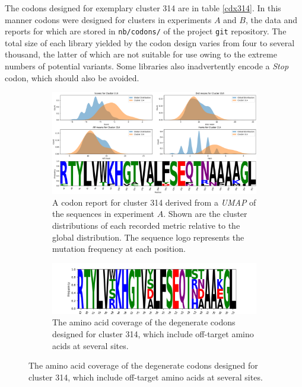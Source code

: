 \documentclass[16pt]{book}
\begin{document}
The codons designed for exemplary cluster 314 are in table \ref{cdx314}.
In this manner codons were designed for clusters in experiments $A$ and $B$, the data and reports for which are stored in \texttt{nb/codons/} of the project \texttt{git}  repository.
The total size of each library yielded by the codon design varies from four to several thousand, the latter of which are not suitable for use owing to the extreme numbers of potential variants.
Some libraries also inadvertently encode a \textit{Stop} codon, which should also be avoided.


\begin{figure}
\begin{subfigure}{\textwidth}
	\includegraphics[width=\textwidth]{img/clus_314.png}
	\caption{\label{cdxreport} A codon report for cluster 314 derived from a \textit{UMAP} of the sequences in experiment $A$.
		 Shown are the cluster distributions of each recorded metric relative to the global distribution.
		 The sequence logo represents the mutation frequency at each position.}
\end{subfigure}
\begin{subfigure}{\textwidth}
	\includegraphics[width=\textwidth]{img/clus_314-codon-coverage.png}
	\caption{\label{cdxreportcoverage} The amino acid coverage of the degenerate codons designed for cluster 314, which include off-target amino acids at several sites.}
\end{subfigure}
\end{figure}

\end{document}

